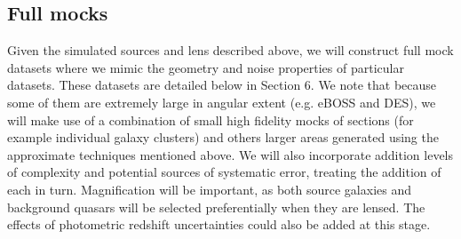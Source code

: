 \subsection{Full mocks}

Given the simulated sources and lens described above, we will construct
full mock datasets where we mimic the geometry and noise properties
of particular datasets. These datasets are detailed below in Section 6.
We note that because some of them are extremely large in
angular extent (e.g. eBOSS and DES), we will make use of a combination of
small high fidelity mocks of sections (for example individual 
galaxy clusters) and others larger areas generated using the approximate 
techniques mentioned above.
We will also incorporate addition levels of
complexity and potential sources of systematic
error, treating the addition of each in turn. 
Magnification will be important, as both source
galaxies and background quasars will be selected preferentially when
they are lensed. The effects of photometric redshift uncertainties
could also  be added 
at this stage.   
